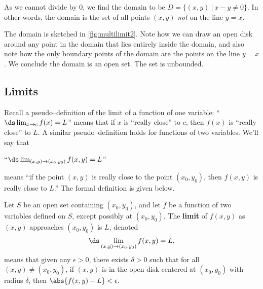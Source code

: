{As we cannot divide by 0, we find the domain to be $D = \{(x,y)\ |\ x-y\neq 0\}$. In other words, the domain is the set of all points $(x,y)$ \emph{not} on the line $y=x$. 


The domain is sketched in \autoref{fig:multilimit2}. Note how we can draw an open disk around any point in the domain that lies entirely inside the domain, and also note how the only boundary points of the domain are the points on the line $y=x$. We conclude the domain is an open set. The set is unbounded.}

\subsection*{Limits}

Recall a pseudo--definition of the limit of a function of one variable: ``$\ds \lim_{x\to c}f(x) = L$'' means that if $x$ is ``really close'' to $c$, then $f(x)$ is ``really close'' to $L$. A similar pseudo--definition holds for functions of two variables. We'll say that 

\begin{center}
``$\ds \lim_{(x,y)\to (x_0,y_0)} f(x,y) = L$''
\end{center}
means ``if the point $(x,y)$ is really close to the point $(x_0,y_0)$, then $f(x,y)$ is really close to $L$.'' The formal definition is given below.

{Let $S$ be an open set containing $(x_0,y_0)$, and let $f$ be a function of two variables defined on $S$, except possibly at $(x_0,y_0)$. 
The \textbf{limit} of $f(x,y)$ as $(x,y)$ approaches $(x_0,y_0)$ is $L$, denoted
\[\ds \lim_{(x,y)\to (x_0,y_0)} f(x,y) = L,\]
means that given any $\epsilon>0$, there exists $\delta>0$ such that for all  $(x,y)\neq (x_0,y_0)$, if $(x,y)$ is in the open disk centered at $(x_0,y_0)$ with radius $\delta$, then $\abs{f(x,y)-L}<\epsilon.$
}

